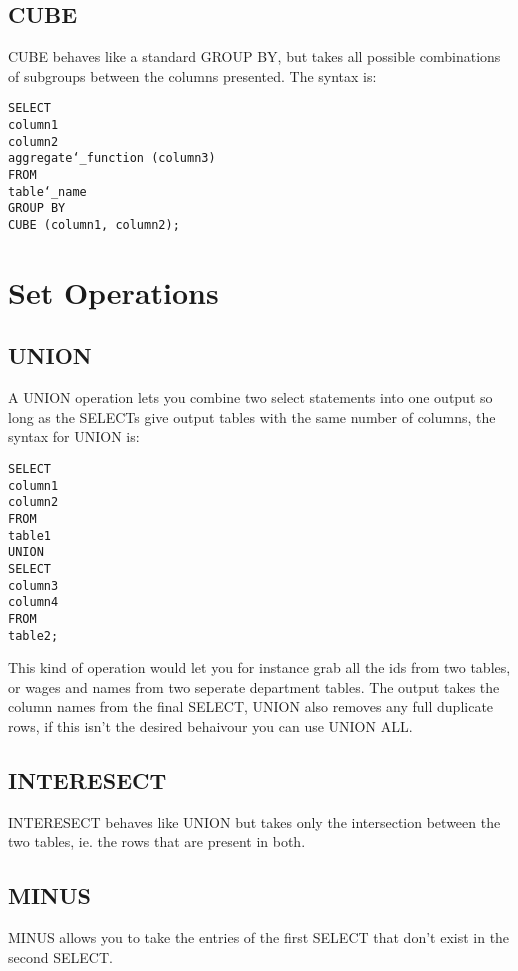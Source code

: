 \documentclass[10pt, english]{article}
\begin{document}
\subsection{CUBE}
CUBE behaves like a standard GROUP BY, but takes all possible combinations of subgroups between 
the columns presented. The syntax is:

\texttt{SELECT\\
\hspace*{10pt} column1 \\
\hspace*{10pt} column2 \\
\hspace*{10pt} aggregate\char`_function (column3) \\
FROM \\
\hspace*{10pt} table\char`_name\\
GROUP BY\\
\hspace*{10pt} CUBE (column1, column2);
}

\newpage
\section{Set Operations}
\subsection{UNION}
A UNION operation lets you combine two select statements into one output so long as the SELECTs give output tables with the same number of columns, the syntax for UNION is:

\texttt{SELECT\\
\hspace*{10pt} column1 \\
\hspace*{10pt} column2 \\
FROM \\
\hspace*{10pt} table1\\
UNION \\
SELECT \\
\hspace*{10pt} column3 \\
\hspace*{10pt} column4 \\
FROM \\
\hspace*{10pt} table2;
}

This kind of operation would let you for instance grab all the ids from two tables, or wages and names from two seperate department tables. The output takes the column names from the final SELECT, UNION also removes
any full duplicate rows, if this isn't the desired behaivour you can use UNION ALL.

\subsection{INTERESECT}
INTERESECT behaves like UNION but takes only the intersection between the two tables, ie. the rows that are present in both.

\subsection{MINUS}
MINUS allows you to take the entries of the first SELECT that don't exist in the second SELECT.
\end{document}
